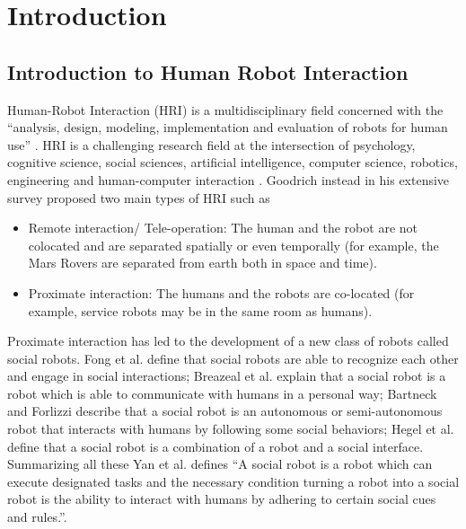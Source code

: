 
\chapter{Introduction} %

\label{Chapter1} %



\section{Introduction to Human Robot Interaction}
	Human-Robot Interaction (HRI) is a multidisciplinary field concerned with the ``analysis, design, modeling, implementation and evaluation of robots for human use'' \cite{fong2003collaboration}. HRI is a challenging research field at the intersection of psychology, cognitive science, social sciences, artificial intelligence, computer science, robotics, engineering and human-computer interaction \cite{dautenhahn2007methodology}. Goodrich \cite{goodrich2007human} instead in his extensive survey proposed two main types of HRI such as
\begin{itemize}
\item Remote interaction/ Tele-operation: The human and the robot are not colocated and are separated spatially or even temporally (for example, the Mars Rovers are separated from earth both in space and time). 
\item Proximate interaction: The humans and the robots are co-located (for example, service robots may be in the same room as humans).
\end{itemize}
	Proximate interaction has led to the development of a new class of robots called social robots. Fong et al. \cite{fong2003survey} define that social robots are able to recognize each other and engage in social interactions; Breazeal et al. \cite{Breazeal:2002:DSR:515422} explain that a social robot is a robot which is able to communicate with humans in a personal way; Bartneck and Forlizzi \cite{bartneck2004design} describe that a social robot is an autonomous or semi-autonomous robot that interacts with humans by following some social behaviors; Hegel et al. \cite{hegel2009understanding} define that a social robot is a combination of a robot and a social interface. Summarizing all these Yan et al. \cite{yan2014survey} defines ``A social robot is a robot which can execute designated tasks and the necessary condition turning a robot into a social robot is the ability to interact with humans by adhering to certain social cues and rules.''. 
	
